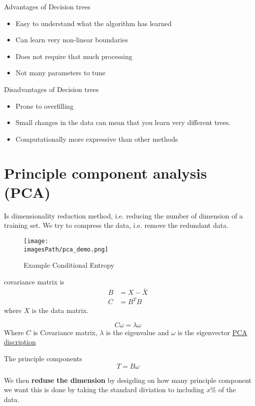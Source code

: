 \documentclass{article}
\newcommand{\imagesPath}{images}
\begin{document}
Advantages of Decision trees
\begin{itemize}
    \item Easy to understand what the algorithm has learned 
    \item Can learn very non-linear boundaries
    \item Does not require that much processing
    \item Not many parameters to tune 
\end{itemize}

Disadvantages of Decision trees
\begin{itemize}
    \item Prone to overfilling 
    \item Small changes in the data can mean that you learn very different trees.
    \item Computationally more expressive than other methods
\end{itemize}

\section{Principle component analysis (PCA)}
Is dimensionality reduction method, i.e. reducing the number of dimension of a training set.
We try to compress the data, i.e. remove the redundant data.
\begin{figure}[!h]
    \centering
    \texttt{[image: \\imagesPath/pca\_demo.png]}
    \caption{Example Conditional Entropy}
    \label{fig:pca_demo}
\end{figure}

covariance matrix is 
\begin{align*}
   B &= X - \bar{X}  \\
   C &= B^TB
\end{align*}
where $X$ is the data matrix.

\begin{equation*}
    C\omega = \lambda\omega
\end{equation*}
Where $C$ is Covariance matrix, $\lambda$ is the eigenvalue and $\omega$ is the eigenvector
\href{https://www.youtube.com/watch?v=fkf4IBRSeEc}{PCA discription}

The principle components 
\begin{equation*}
    T = B\omega
\end{equation*}

We then \textbf{reduse the dimension} by desigding on how many principle component we want
this is done by taking the standard diviation to including $x\%$ of the data.
\end{document}
